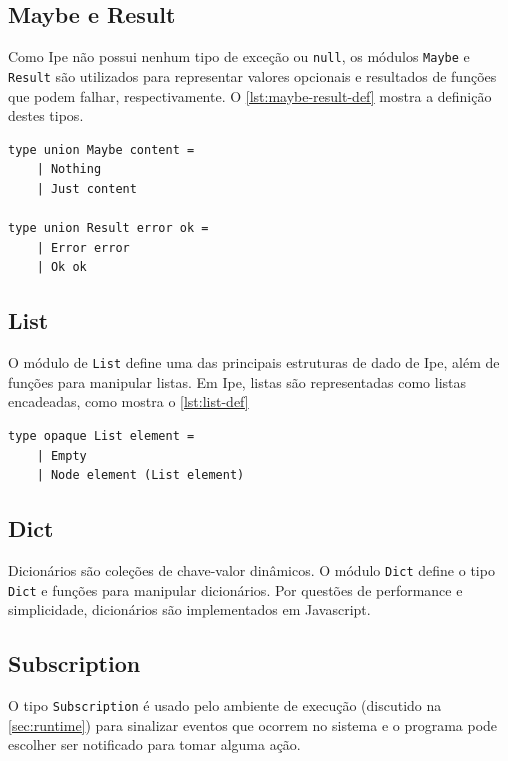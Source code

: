 \subsection{Maybe e Result}

Como Ipe não possui nenhum tipo de exceção ou \texttt{null}, os módulos \texttt{Maybe}
e \texttt{Result} são utilizados para representar valores opcionais e resultados
de funções que podem falhar, respectivamente. O \autoref{lst:maybe-result-def}
mostra a definição destes tipos.

\begin{lstlisting}[label={lst:maybe-result-def},caption={Definição de \texttt{Maybe} e \texttt{Result}}]
type union Maybe content =
    | Nothing
    | Just content

type union Result error ok =
    | Error error
    | Ok ok
\end{lstlisting}


\subsection{List}

O módulo de \texttt{List} define uma das principais estruturas de dado de Ipe,
além de funções para manipular listas. Em Ipe, listas são representadas como
listas encadeadas, como mostra o \autoref{lst:list-def}

\begin{lstlisting}[label={lst:list-def},caption={Definição de listas em Ipe}]
type opaque List element =
    | Empty
    | Node element (List element)
\end{lstlisting}

\subsection{Dict}

Dicionários são coleções de chave-valor dinâmicos. O módulo \texttt{Dict} define
o tipo \texttt{Dict} e funções para manipular dicionários. Por questões de performance
e simplicidade, dicionários são implementados em Javascript.

\subsection{Subscription}

O tipo \texttt{Subscription} é usado pelo ambiente de execução (discutido na
\autoref{sec:runtime}) para sinalizar eventos que ocorrem no sistema e o programa
pode escolher ser notificado para tomar alguma ação.


